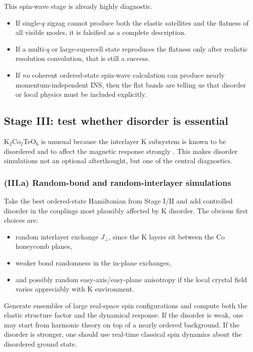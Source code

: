 \documentclass[11pt]{article}
\begin{document}
This spin-wave stage is already highly diagnostic.
\begin{itemize}[leftmargin=2em,itemsep=0.35em]
    \item If single-$q$ zigzag cannot produce both the elastic satellites and the flatness of all visible modes, it is falsified as a complete description.
    \item If a multi-$q$ or large-supercell state reproduces the flatness only after realistic resolution convolution, that is still a success.
    \item If \emph{no} coherent ordered-state spin-wave calculation can produce nearly momentum-independent INS, then the flat bands are telling us that disorder or local physics must be included explicitly.
\end{itemize}

\subsection{Stage III: test whether disorder is essential}

K$_2$Co$_2$TeO$_6$ is unusual because the interlayer K subsystem is known to be disordered and to affect the magnetic response strongly \cite{Xu2023K2Co2TeO6}. This makes disorder simulations not an optional afterthought, but one of the central diagnostics.

\subsubsection*{(III.a) Random-bond and random-interlayer simulations}

Take the best ordered-state Hamiltonian from Stage I/II and add controlled disorder in the couplings most plausibly affected by K disorder. The obvious first choices are:
\begin{itemize}[leftmargin=2em,itemsep=0.35em]
    \item random interlayer exchange $J_\perp$, since the K layers sit between the Co honeycomb planes,
    \item weaker bond randomness in the in-plane exchanges,
    \item and possibly random easy-axis/easy-plane anisotropy if the local crystal field varies appreciably with K environment.
\end{itemize}

Generate ensembles of large real-space spin configurations and compute both the elastic structure factor and the dynamical response. If the disorder is weak, one may start from harmonic theory on top of a nearly ordered background. If the disorder is stronger, one should use real-time classical spin dynamics about the disordered ground state.
\end{document}
